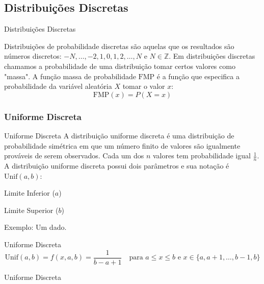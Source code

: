 \subsection{Distribuições Discretas}
\begin{frame}{Distribuições Discretas}
    \begin{defn}
        Distribuições de probabilidade discretas são aquelas que os resultados são números
        discretos: $-N, \dots, -2, 1, 0,1,2,\dots, N$ e $N \in \mathbb{Z}$. Em distribuições discretas chamamos a
        probabilidade de uma distribuição tomar certos valores como "massa". A função massa de probabilidade
        $\text{FMP}$ é a função que especifica a probabilidade da variável aleatória $X$ tomar o valor $x$:
        $$\text{FMP}(x) = P(X = x)$$
    \end{defn}
\end{frame}

\subsubsection{Uniforme Discreta}
\begin{frame}{Uniforme Discreta}
    A distribuição uniforme discreta é uma distribuição de probabilidade simétrica em que um número finito de valores
    são igualmente prováveis de serem observados. Cada um dos $n$ valores tem probabilidade igual $\frac{1}{n}$.
    \vfill
    A distribuição uniforme discreta possui dois parâmetros e sua notação é $\text{Unif}(a, b)$:
    \begin{vfilleditems}
        \item Limite Inferior ($a$)
        \item Limite Superior ($b$)
    \end{vfilleditems}
    \vfill
    Exemplo: Um dado.
\end{frame}

\begin{frame}{Uniforme Discreta}
    $$\text{Unif}(a,b) = f(x, a, b) = \frac{1}{b-a+1} \quad \text{para $a \leq x \leq b$ e $x\in \{a,a+1,\dots ,b-1,b\}$}$$
\end{frame}

\begin{frame}{Uniforme Discreta}
    \centering
\end{frame}

